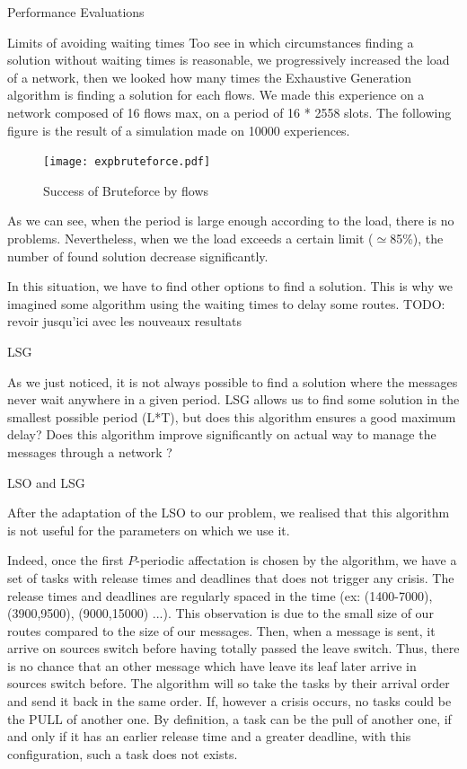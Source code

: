 \documentclass[a4paper,10pt]{report}
\newcommand{\todo}[1]{}
\renewcommand{\todo}[1]{{\color{red} TODO: {#1}}}
\begin{document}
\begin{chapter}{Performance Evaluations}
\begin{section}{Limits of avoiding waiting times}
Too see in which circumstances finding a solution without waiting times is reasonable, we progressively increased the load of a network,
then we looked how many times the Exhaustive Generation algorithm is finding a solution for each flows.
We made this experience on a network composed of 16 flows max, on a period of 16 * 2558 slots.
The following figure is the result of a simulation made on 10000 experiences.

\begin{figure}[H]
\hspace*{-3cm}
\centering
\texttt{[image: expbruteforce.pdf]}%
\caption{Success of Bruteforce by flows}
\end{figure}
As we can see, when the period is large enough according to the load, there is no problems. Nevertheless, when we the load exceeds a certain limit 
($\simeq$85\%), the number of found solution decrease significantly.

In this situation, we have to find other options to find a solution. This is why we imagined some algorithm using the waiting times to delay some routes.
\todo{revoir jusqu'ici avec les nouveaux resultats}
\end{section}

\begin{section}{LSG}

As we just noticed, it is not always possible to find a solution where the messages never wait anywhere in a given period.
LSG allows us to find some solution in the smallest possible period (L*T), but does this algorithm ensures a good maximum delay?
Does this algorithm improve significantly on actual way to manage the messages through a network ?

\begin{subsection}{LSO and LSG}

After the adaptation of the LSO to our problem, we realised that this algorithm is not useful for the parameters on which we use it. 

Indeed, once the first $P$-periodic affectation is chosen
by the algorithm, we have a set of tasks with release times and deadlines that does not trigger any crisis.
The release times and deadlines are regularly spaced in the time (ex: (1400-7000), (3900,9500), (9000,15000) ...).
This observation is due to the small size of our routes compared to the size of our messages. Then, when a message is sent, it arrive on sources switch before having totally passed the leave switch. Thus, there is no chance that an other message which have leave its leaf later arrive in sources switch before.
The algorithm will so take the tasks by their arrival order and send it back in the same order. If, however a crisis occurs, no tasks could be the PULL
of another one. By definition, a task can be the pull of another one, if and only if it has an earlier release time and a greater deadline, with this configuration, such a task does not exists.


\end{subsection}
\end{section}
\end{chapter}
\end{document}
